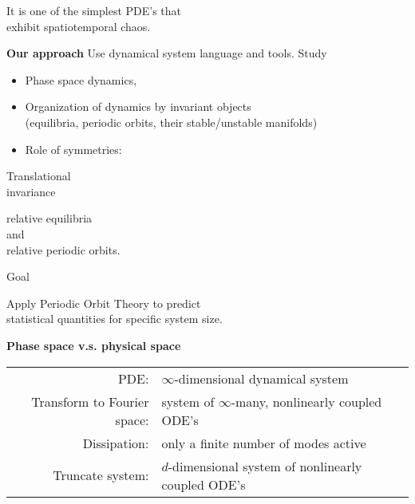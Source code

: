 \documentclass{article}
\begin{document}
\newpage

\begin{minipage}[t]{7in}
 \begin{center}
 It is one of the simplest PDE's that\\ 
 exhibit spatiotemporal chaos.
 \end{center}
\end{minipage}

\newpage
{\color{NavyBlue}\LARGE\bf Our approach }
\newpage 
{\color{NavyBlue} Use dynamical system language and tools. }
\newpage 
Study
\newpage

\begin{minipage}[t]{6in}
\begin{itemize}
	\item Phase space dynamics, 
	\item Organization of dynamics by invariant objects\\ 
	(equilibria, periodic orbits, their stable/unstable manifolds)
	\item Role of symmetries: 
\end{itemize}
\end{minipage}

\newpage
\begin{center}
Translational\\ invariance  
\end{center}
\newpage
\begin{center}
relative equilibria\\ and\\ relative periodic orbits.
\end{center}
\newpage
Goal
\newpage

\begin{minipage}[t]{7in}
	\begin{center}
		Apply Periodic Orbit Theory to predict \\
		statistical quantities for specific system size.
	\end{center}
\end{minipage}

\newpage

{\color{NavyBlue}\LARGE\bf  Phase space v.s. physical space }

\newpage

\begin{flushleft}
	\begin{tabular}{rl}
		PDE: &  $\infty$-dimensional dynamical system \\
	
		Transform to Fourier space: & system of $\infty$-many, nonlinearly coupled ODE's \\
	
		Dissipation: & only a finite number of modes active \\
	
		Truncate system: & $d$-dimensional system of nonlinearly coupled ODE's
	\end{tabular}
\end{flushleft}
\end{document}
